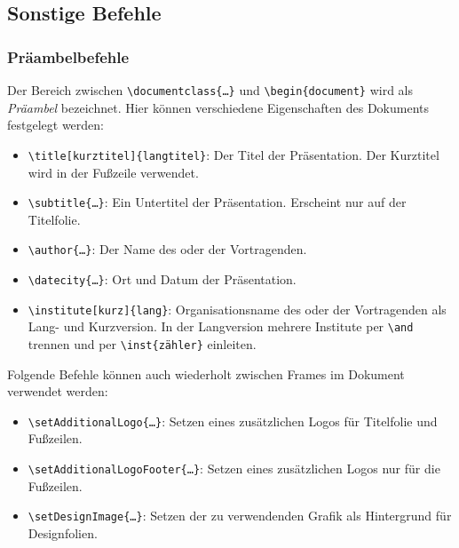 \documentclass[german,notoc]{tudbeamer}%
\begin{document}
\subsection{Sonstige Befehle}
\begin{frame}[fragile]
	\frametitle{Präambelbefehle}
	Der Bereich zwischen \texttt{\textbackslash documentclass\{\dots\}} und \texttt{\textbackslash begin\{document\}} wird als \emph{Präambel} bezeichnet. Hier können verschiedene Eigenschaften des Dokuments festgelegt werden:
	\begin{itemize}
		\item \texttt{\textbackslash title[kurztitel]\{langtitel\}}: Der Titel der Präsentation. Der Kurztitel wird in der Fußzeile verwendet.
		\item \texttt{\textbackslash subtitle\{\dots\}}: Ein Untertitel der Präsentation. Erscheint nur auf der Titelfolie.
		\item \texttt{\textbackslash author\{\dots\}}: Der Name des oder der Vortragenden.
		\item \texttt{\textbackslash datecity\{\dots\}}: Ort und Datum der Präsentation.
		\item \texttt{\textbackslash institute[kurz]\{lang\}}: Organisationsname des oder der Vortragenden als Lang- und Kurzversion. In der Langversion mehrere Institute per \texttt{\textbackslash and} trennen und per \texttt{\textbackslash inst\{zähler\}} einleiten.
	\end{itemize}
	Folgende Befehle können auch wiederholt zwischen Frames im Dokument verwendet werden:
	\begin{itemize}
		\item \texttt{\textbackslash setAdditionalLogo\{\dots\}}: Setzen eines zusätzlichen Logos für Titelfolie und Fußzeilen.
		\item \texttt{\textbackslash setAdditionalLogoFooter\{\dots\}}: Setzen eines zusätzlichen Logos nur für die Fußzeilen.
		\item \texttt{\textbackslash setDesignImage\{\dots\}}: Setzen der zu verwendenden Grafik als Hintergrund für Designfolien.
	\end{itemize}
\end{frame}
\end{document}

